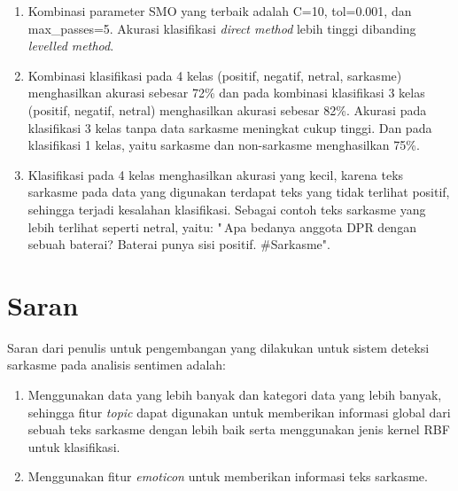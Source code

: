 \begin{enumerate}
	\item Kombinasi parameter SMO yang terbaik adalah C=10, tol=0.001, dan max\_passes=5. Akurasi klasifikasi \textit{direct method} lebih tinggi dibanding \textit{levelled method}.
	\item Kombinasi klasifikasi pada 4 kelas (positif, negatif, netral, sarkasme) menghasilkan akurasi sebesar 72\% dan pada kombinasi klasifikasi 3 kelas (positif, negatif, netral) menghasilkan akurasi sebesar 82\%. Akurasi pada klasifikasi 3 kelas tanpa data sarkasme meningkat cukup tinggi. Dan pada klasifikasi 1 kelas, yaitu sarkasme dan non-sarkasme menghasilkan 75\%. 
	\item Klasifikasi pada 4 kelas menghasilkan akurasi yang kecil, karena teks sarkasme pada data yang digunakan terdapat teks yang tidak terlihat positif, sehingga terjadi kesalahan klasifikasi. Sebagai contoh teks sarkasme yang lebih terlihat seperti netral, yaitu: "\,Apa bedanya anggota DPR dengan sebuah baterai? Baterai punya sisi positif. 
	\#Sarkasme".
\end{enumerate}
\section{Saran}
Saran dari penulis untuk pengembangan yang dilakukan untuk sistem deteksi sarkasme pada analisis sentimen adalah:
\begin{enumerate}
	\item Menggunakan data yang lebih banyak dan kategori data yang lebih banyak, sehingga fitur \textit{topic} dapat digunakan untuk memberikan informasi global dari sebuah teks sarkasme dengan lebih baik serta menggunakan jenis kernel RBF untuk klasifikasi.
	\item Menggunakan fitur \textit{emoticon} untuk memberikan informasi teks sarkasme.
\end{enumerate}
\newpage
